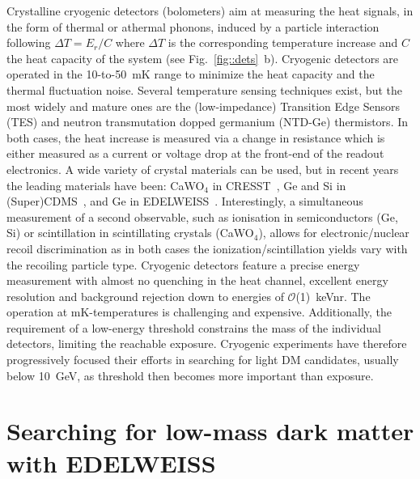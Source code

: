 Crystalline cryogenic detectors (bolometers) aim at measuring the heat signals, in the form of thermal or athermal phonons, induced by a particle interaction following $\Delta T = E_r/C$ where $\Delta T$ is the corresponding temperature increase and $C$ the heat capacity of the system (see Fig.~\ref{fig::dets}~b). Cryogenic detectors are operated in the 10-to-50~mK range to minimize the heat capacity and the thermal fluctuation noise. Several temperature sensing techniques exist, but the most widely and mature ones are the (low-impedance) Transition Edge Sensors (TES) and neutron transmutation dopped germanium (NTD-Ge) thermistors. In both cases, the heat increase is measured via a change in resistance which is either measured as a current or voltage drop at the front-end of the readout electronics. A wide variety of crystal materials can be used, but in recent years the leading materials have been: CaWO$_4$ in CRESST~\cite{Abdelhameed:2019hmk}, Ge and Si in (Super)CDMS~\cite{Agnese:2013ixa}, and Ge in EDELWEISS~\cite{Armengaud:2017rzu}. Interestingly, a simultaneous measurement of a second observable, such as ionisation in semiconductors (Ge, Si) or scintillation in scintillating crystals (CaWO$_4$), allows for electronic/nuclear recoil discrimination as in both cases the ionization/scintillation yields vary with the recoiling particle type. Cryogenic detectors feature a precise energy measurement with almost no quenching in the heat channel, excellent energy resolution and background rejection down to energies of $\mathcal{O}$(1)~keVnr. The operation at mK-temperatures is challenging and expensive. Additionally, the requirement of a low-energy threshold constrains the mass of the individual detectors, limiting the reachable exposure. Cryogenic experiments have therefore progressively focused their efforts in searching for light DM candidates, usually below 10~GeV, as threshold then becomes more important than exposure.\\



\section{Searching for low-mass dark matter with EDELWEISS}
\label{sec:EDELWEISS}

